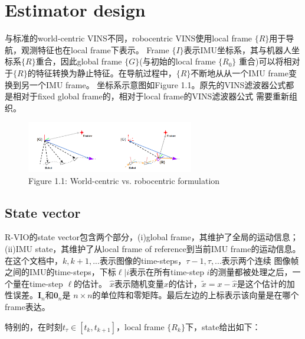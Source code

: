 \documentclass[a4paper, UTF8, fontset=adobe]{ctexart}
\begin{document}
	
\tableofcontents %

\thispagestyle{empty}

\newpage
{}

\section{Estimator design}
与标准的world-centric VINS不同，robocentric VINS使用local frame $\{R\}$用于导航，观测特征也在local frame下表示。
Frame $\{I\}$表示IMU坐标系，其与机器人坐标系$\{R\}$重合，因此global frame $\{G\}$(与初始的local frame $\{R_0\}$
重合)可以将相对于$\{R\}$的特征转换为静止特征。在导航过程中，$\{R\}$不断地从从一个IMU frame变换到另一个IMU frame。
坐标系示意图如Figure 1.1。原先的VINS滤波器公式都是相对于fixed global frame的，相对于local frame的VINS滤波器公式
需要重新组织。

\begin{figure}[ht]
\centering
\includegraphics[width=0.65\textwidth]{figures/robocentric formulation illustration.png}
\captionsetup{labelformat=empty}
\caption{Figure 1.1: World-centric vs. robocentric formulation}
\end{figure}

\subsection{State vector}
R-VIO的state vector包含两个部分，(i)global frame，其维护了全局的运动信息；(ii)IMU state，其维护了从local frame of
reference到当前IMU frame的运动信息。在这个文档中，$k,k+1,...$表示图像的time-steps，$\tau - 1,\tau,...$表示两个连续
图像帧之间的IMU的time-steps，下标$\ell | i$表示在所有time-step $i$的测量都被处理之后，一个量在time-step $\ell$的估计。
$\hat{x}$表示随机变量$x$的估计，$\tilde{x}=x-\hat{x}$是这个估计的加性误差。$\mathbf{I}_n$和$\bm{0}_n$是
$n\times n$的单位阵和零矩阵。最后左边的上标表示该向量是在哪个frame表达。

特别的，在时刻$t_{\tau}\in \left[t_k,t_{k+1}\right]$，local frame $\{R_k\}$下，state给出如下：
\end{document}
